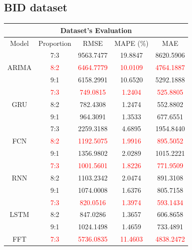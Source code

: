 \documentclass{ieeeojies}
\begin{document}
\subsection{BID dataset} 
\begin{table}[H]
    \centering
    \begin{tabular}{|c|c|c|c|c|}
         \hline
         \multicolumn{5}{|c|}{\textbf{Dataset's Evaluation}}\\
         \hline
         \centering Model & Proportion & RMSE & MAPE (\%) & MAE\\
         \hline
         \multirow{3}{*}{ARIMA} 
         & 7:3 & 9563.7477 & 19.8847 & 8620.5906 \\ 
         & \textcolor{red}{8:2} & \textcolor{red}{6464.7779} & \textcolor{red}{10.0109} & \textcolor{red}{4764.1887} \\ 
         & 9:1 & 6158.2991 & 10.6520 & 5292.1888 \\
         \hline
         \multirow{3}{*}{GRU} 
         & \textcolor{red}{7:3} & \textcolor{red}{749.0815} & \textcolor{red}{1.2404} & \textcolor{red}{525.8805} \\ 
         & 8:2 & 782.4308 & 1.2474 & 552.8802 \\
         & 9:1 & 964.3091 & 1.3533 & 677.6551 \\
         \hline
         \multirow{3}{*}{FCN} 
         & 7:3 & 2259.3188 & 4.6895 & 1954.8440 \\ 
         & \textcolor{red}{8:2} & \textcolor{red}{1192.5075} & \textcolor{red}{1.9916} & \textcolor{red}{895.5052} \\ 
         & 9:1 & 1356.9802 & 2.0289 & 1015.2221 \\
         \hline
         \multirow{3}{*}{RNN} 
         & \textcolor{red}{7:3} & \textcolor{red}{1001.5601} & \textcolor{red}{1.8226} & \textcolor{red}{771.9509} \\ 
         & 8:2 & 1103.2342 & 2.0474 & 891.3108 \\ 
         & 9:1 & 1074.0008 & 1.6376 & 805.7158 \\
         \hline
         \multirow{3}{*}{LSTM} 
         & \textcolor{red}{7:3} & \textcolor{red}{820.0516} & \textcolor{red}{1.3974} & \textcolor{red}{593.1434} \\ 
         & 8:2 & 847.0286 & 1.3657 & 606.8658 \\ 
         & 9:1 & 1024.1498 & 1.4659 & 733.4891 \\
         \hline
         \multirow{3}{*}{FFT} 
         & \textcolor{red}{7:3} & \textcolor{red}{5736.0835} & \textcolor{red}{11.4603} & \textcolor{red}{4838.2472} \\

\end{tabular}
\end{table}
\end{document}

